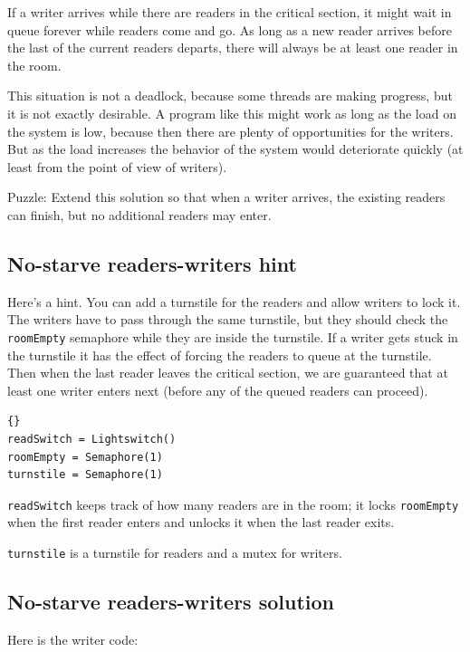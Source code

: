 \documentclass{book}
\newcommand{\clearemptydoublepage}{\newpage\cleardoublepage}
\begin{document}
If a writer arrives while there are readers in the critical section,
it might wait in queue forever while readers come and go.  As long
as a new reader arrives before the last of the current readers
departs, there will always be at least one reader in the room.

This situation is not a deadlock, because some threads are making
progress, but it is not exactly desirable.  A program like this
might work as long as the load on the system is low, because then there
are plenty of opportunities for the writers.  But as the load
increases the behavior of the system would deteriorate quickly
(at least from the point of view of writers).

Puzzle: Extend this solution so that when a writer arrives,
the existing readers can finish, but no additional readers
may enter.


\clearemptydoublepage
\subsection {No-starve readers-writers hint}  

Here's a hint.  You can add a turnstile for the readers and
allow writers to lock it.  The writers have to pass through
the same turnstile, but they should check the {\tt roomEmpty}
semaphore while they are inside the turnstile.  If a writer
gets stuck in the turnstile it has the effect of forcing the
readers to queue at the turnstile.  Then when the last reader
leaves the critical section, we are guaranteed that at least
one writer enters next (before any of the queued readers can
proceed).

\begin{lstlisting}[caption={No-starve readers-writers initialization}]{}
readSwitch = Lightswitch()
roomEmpty = Semaphore(1)
turnstile = Semaphore(1)
\end{lstlisting}

{\tt readSwitch} keeps track of how many readers are in the room;
it locks {\tt roomEmpty} when the first reader
enters and unlocks it when the last reader exits.

{\tt turnstile} is a turnstile for readers and a 
mutex for writers.


\clearemptydoublepage
\subsection {No-starve readers-writers solution}  

Here is the writer code:
\end{document}
